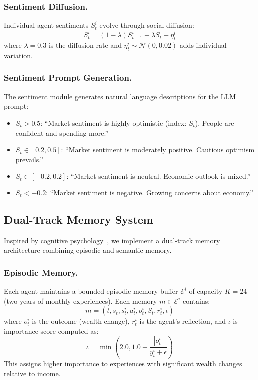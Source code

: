 \documentclass[runningheads]{llncs}
\begin{document}
\subsubsection{Sentiment Diffusion.}
Individual agent sentiments $S_t^i$ evolve through social diffusion:
\begin{equation}
S_t^i = (1 - \lambda) S_{t-1}^i + \lambda S_t + \eta_t^i
\end{equation}
where $\lambda = 0.3$ is the diffusion rate and $\eta_t^i \sim \mathcal{N}(0, 0.02)$ adds individual variation.

\subsubsection{Sentiment Prompt Generation.}
The sentiment module generates natural language descriptions for the LLM prompt:
\begin{itemize}
    \item $S_t > 0.5$: ``Market sentiment is highly optimistic (index: $S_t$). People are confident and spending more.''
    \item $S_t \in [0.2, 0.5]$: ``Market sentiment is moderately positive. Cautious optimism prevails.''
    \item $S_t \in [-0.2, 0.2]$: ``Market sentiment is neutral. Economic outlook is mixed.''
    \item $S_t < -0.2$: ``Market sentiment is negative. Growing concerns about economy.''
\end{itemize}

\subsection{Dual-Track Memory System}

Inspired by cognitive psychology~\cite{tulving1972episodic}, we implement a dual-track memory architecture combining episodic and semantic memory.

\subsubsection{Episodic Memory.}
Each agent maintains a bounded episodic memory buffer $\mathcal{E}^i$ of capacity $K = 24$ (two years of monthly experiences). Each memory $m \in \mathcal{E}^i$ contains:
\begin{equation}
m = (t, s_t, s_t^i, a_t^i, o_t^i, S_t, r_t^i, \iota)
\end{equation}
where $o_t^i$ is the outcome (wealth change), $r_t^i$ is the agent's reflection, and $\iota$ is importance score computed as:
\begin{equation}
\iota = \min\left(2.0, 1.0 + \frac{|o_t^i|}{y_t^i + \epsilon}\right)
\end{equation}
This assigns higher importance to experiences with significant wealth changes relative to income.
\end{document}
